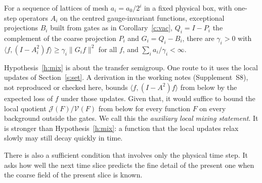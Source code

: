 \begin{hypothesis}\label{h:mix}
For a sequence of lattices of mesh $a_i=a_0/2^i$ in a fixed physical box, with one-step operators $A_i$ on the
centred gauge-invariant functions, exceptional projections $B_i$ built from gates as in Corollary~\ref{c:vac},
$Q_i=I-P_i$ the complement of the coarse projection $P_i$ and $G_i=Q_i-B_i$, there are $\gamma_i>0$ with $\langle f,(I-A_i^2)f\rangle\ge\gamma_i\|G_if\|^2$ for all $f$, and
$\sum_ia_i/\gamma_i<\infty$.
\end{hypothesis}

Hypothesis~\ref{h:mix} is about the transfer semigroup. One route to it uses the local updates of
Section~\ref{s:set}. A derivation in the working notes (Supplement~S8), not reproduced or checked here, bounds
$\langle f,(I-A^2)f\rangle$ from below by the expected loss of $f$ under those updates. Given that, it would
suffice to bound the local quotient $\mathcal J(F)/\mathcal V(F)$ from below for every function $F$ on every
background outside the gates. We call this the \emph{auxiliary local mixing statement}. It is stronger than
Hypothesis~\ref{h:mix}: a function that the local updates relax slowly may still decay quickly in time.

There is also a sufficient condition that involves only the physical time step. It asks how well the next
time slice predicts the fine detail of the present one when the coarse field of the present slice is known.

